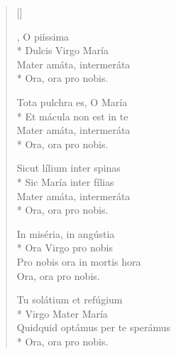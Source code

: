 \newHymn



\begin{verse}[\versewidth]

, O piíssima\\*
Dulcis Virgo María\\
Mater amáta, intermeráta\\*
Ora, ora pro nobis.

Tota pulchra es, O María\\*
Et mácula non est in te\\
Mater amáta, intermeráta\\*
Ora, ora pro nobis.

Sicut lílium inter spinas\\*
Sic María inter fílias\\
Mater amáta, intermeráta\\*
Ora, ora pro nobis.

In miséria, in angústia\\*
Ora Virgo pro nobis\\
Pro nobis ora in mortis hora\\
Ora, ora pro nobis.

Tu solátium et refúgium\\*
Virgo Mater María\\
Quidquid optámus per te sperámus\\*
Ora, ora pro nobis.

\end{verse}

